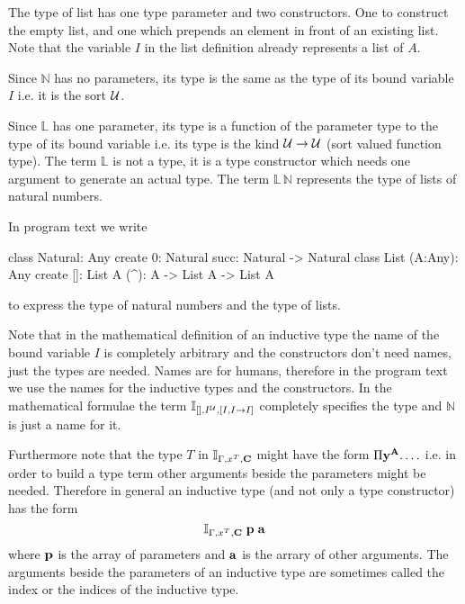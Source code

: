 \begin{description}
  The type of list has one type parameter and two constructors. One to
  construct the empty list, and one which prepends an element in front of an
  existing list. Note that the variable $I$ in the list definition already
  represents a list of $A$.

  Since $\mathbb{N}$ has no parameters, its type is the same as the type of
  its bound variable $I$ i.e. it is the sort ${\cal{U}}$.

  Since $\mathbb{L}$ has one parameter, its type is a function of the
  parameter type to the type of its bound variable i.e. its type is the kind
  ${\cal{U}} \to {\cal{U}}$ (sort valued function type). The term $\mathbb{L}$ is not a
  type, it is a type constructor which needs one argument to generate an
  actual type. The term $\mathbb{L} \, \mathbb{N}$ represents the type of
  lists of natural numbers.

  In program text we write
  \begin{alba}
      class Natural: Any create
        0: Natural
        succ: Natural -> Natural
      class List (A:Any): Any create
        []: List A
        (^): A -> List A -> List A
  \end{alba}
  to express the type of natural numbers and the type of lists.

  Note that in the mathematical definition of an inductive type the name of
  the bound variable $I$ is completely arbitrary and the constructors don't
  need names, just the types are needed. Names are for humans, therefore in
  the program text we use the names for the inductive types and the
  constructors. In the mathematical formulae the term
  $\mathbb{I}_{[], I^{\cal{U}}, [I, I \to I]}$ completely specifies the type and
  $\mathbb{N}$ is just a name for it.

  Furthermore note that the type $T$ in $\mathbb{I}_{\Gamma, x^T, \mathbf{C}}$
  might have the form $\Pi \mathbf{y}^{\mathbf{A}}. \ldots$ i.e. in order to build a
  type term other arguments beside the parameters might be needed. Therefore
  in general an inductive type (and not only a type constructor) has the form
  $$
  \mathbb{I}_{\Gamma, x^T, \mathbf{C}} \; \mathbf{p} \; \mathbf{a}
  $$
  where $\mathbf{p}$ is the array of parameters and $\mathbf{a}$ is the arrary of
  other arguments. The arguments beside the parameters of an inductive type
  are sometimes called the index or the indices of the inductive type.



\end{description}
